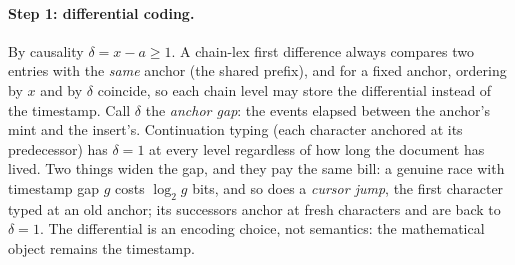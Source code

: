 \documentclass[11pt]{article}
\begin{document}
\paragraph{Step 1: differential coding.} By causality
$\delta = x - a \ge 1$. A chain-lex first difference always compares
two entries with the \emph{same} anchor (the shared prefix), and for
a fixed anchor, ordering by $x$ and by $\delta$ coincide, so each
chain level may store the differential instead of the timestamp.
Call $\delta$ the \emph{anchor gap}: the events elapsed between the
anchor's mint and the insert's.
Continuation typing (each character anchored at its predecessor) has
$\delta = 1$ at every level regardless of how long the document has
lived. Two things widen the gap, and they pay the same bill: a
genuine race with timestamp gap $g$ costs $\log_2 g$ bits, and so
does a \emph{cursor jump}, the first character typed at an old
anchor; its successors anchor at fresh characters and are back to
$\delta = 1$. The differential is an encoding choice, not
semantics: the mathematical object remains the timestamp.
\end{document}
